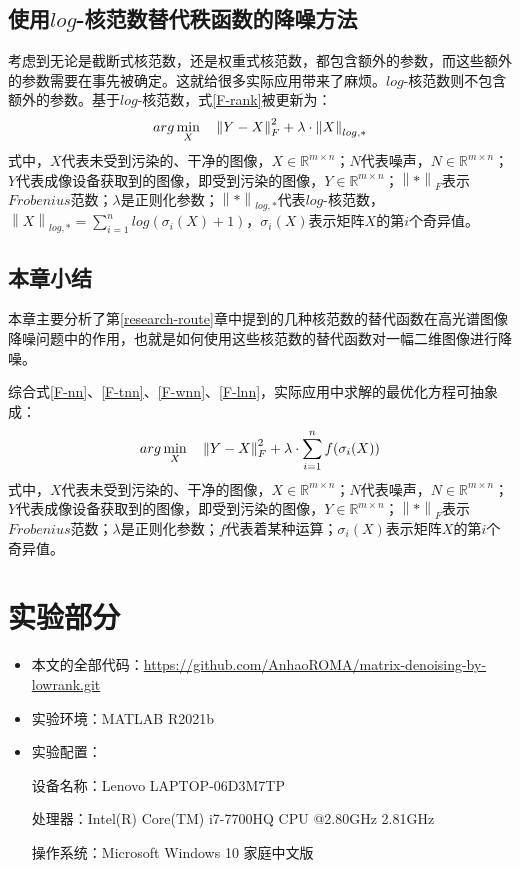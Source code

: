 \documentclass[12pt, a4paper]{article}
\begin{document}
\subsection{使用$log$-核范数替代秩函数的降噪方法}
\par 考虑到无论是截断式核范数，还是权重式核范数，都包含额外的参数，而这些额外的参数需要在事先被确定。这就给很多实际应用带来了麻烦。$log$-核范数则不包含额外的参数。基于$log$-核范数，式\ref{F-rank}被更新为：
\begin{equation}
\centering
arg\min\limits_{X} \quad \left\|Y-X\right\|_F^2 + \lambda \cdot \left\|X\right\|_{log,*}
\label{F-lnn}
\end{equation}
式中，$X$代表未受到污染的、干净的图像，$X \in \mathbb{R}^{m \times n}$；$N$代表噪声，$N \in \mathbb{R}^{m \times n}$；$Y$代表成像设备获取到的图像，即受到污染的图像，$Y \in \mathbb{R}^{m \times n}$；$\left\|*\right\|_F$表示$Frobenius$范数；$\lambda$是正则化参数；$\left\|*\right\|_{log,*}$代表$log$-核范数，$\left\|X\right\|_{log,*} = \sum\limits_{i=1}^{n}log(\sigma_i(X)+1)$，$\sigma_i(X)$表示矩阵$X$的第$i$个奇异值。

\subsection{本章小结}
\par 本章主要分析了第\ref{research-route}章中提到的几种核范数的替代函数在高光谱图像降噪问题中的作用，也就是如何使用这些核范数的替代函数对一幅二维图像进行降噪。
\par 综合式\ref{F-nn}、\ref{F-tnn}、\ref{F-wnn}、\ref{F-lnn}，实际应用中求解的最优化方程可抽象成：
\begin{displaymath}
\centering
arg\min\limits_{X} \quad \left\|Y-X\right\|_F^2 + \lambda \cdot \sum\limits_{i=1}^{n}f(\sigma_i(X))
\end{displaymath}
式中，$X$代表未受到污染的、干净的图像，$X \in \mathbb{R}^{m \times n}$；$N$代表噪声，$N \in \mathbb{R}^{m \times n}$；$Y$代表成像设备获取到的图像，即受到污染的图像，$Y \in \mathbb{R}^{m \times n}$；$\left\|*\right\|_F$表示$Frobenius$范数；$\lambda$是正则化参数；$f$代表着某种运算；$\sigma_i(X)$表示矩阵$X$的第$i$个奇异值。
\newpage
\section{实验部分}\label{experiment}
\begin{itemize}
\item 本文的全部代码：{\url{https://github.com/AnhaoROMA/matrix-denoising-by-lowrank.git}}
\item 实验环境：MATLAB R2021b
\item 实验配置：
\par 设备名称：Lenovo LAPTOP-06D3M7TP
\par 处理器：Intel(R) Core(TM) i7-7700HQ CPU @2.80GHz 2.81GHz
\par 操作系统：Microsoft Windows 10 家庭中文版
\end{itemize}
\end{document}
